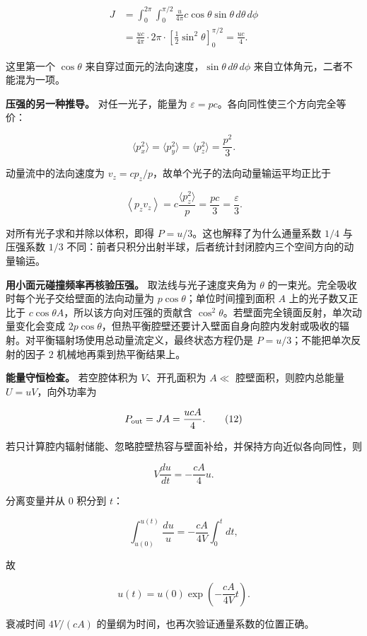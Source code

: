 \documentclass[12pt,a4paper,UTF8]{ctexart}
\begin{document}
\[
\begin{aligned}
J&=\int_0^{2\pi}\!\int_0^{\pi/2}
\frac{u}{4\pi}c\cos\theta\sin\theta\,d\theta\,d\phi\\
&=\frac{uc}{4\pi}\cdot2\pi\cdot
\left[\frac12\sin^2\theta\right]_0^{\pi/2}
=\frac{uc}{4}. 
\end{aligned} \tag{9}
\]

这里第一个 \(\cos\theta\)
来自穿过面元的法向速度，\(\sin\theta\,d\theta\,d\phi\)
来自立体角元，二者不能混为一项。

\textbf{压强的另一种推导。} 对任一光子，能量为
\(\varepsilon=pc\)。各向同性使三个方向完全等价：

\[
\langle p_x^2\rangle=
\langle p_y^2\rangle=
\langle p_z^2\rangle=\frac{p^2}{3}. \tag{10}
\]

动量流中的法向速度为 \(v_z=cp_z/p\)，故单个光子的法向动量输运平均正比于

\[
\left\langle p_zv_z\right\rangle
=c\frac{\langle p_z^2\rangle}{p}
=\frac{pc}{3}=\frac{\varepsilon}{3}. \tag{11}
\]

对所有光子求和并除以体积，即得 \(P=u/3\)。这也解释了为什么通量系数
\(1/4\) 与压强系数 \(1/3\)
不同：前者只积分出射半球，后者统计封闭腔内三个空间方向的动量输运。

\textbf{用小面元碰撞频率再核验压强。} 取法线与光子速度夹角为 \(\theta\)
的一束光。完全吸收时每个光子交给壁面的法向动量为
\(p\cos\theta\)；单位时间撞到面积 \(A\) 上的光子数又正比于
\(c\cos\theta A\)，所以该方向对压强的贡献含
\(\cos^2\theta\)。若壁面完全镜面反射，单次动量变化会变成
\(2p\cos\theta\)，但热平衡腔壁还要计入壁面自身向腔内发射或吸收的辐射。对平衡辐射场使用总动量流定义，最终状态方程仍是
\(P=u/3\)；不能把单次反射的因子 \(2\) 机械地再乘到热平衡结果上。

\textbf{能量守恒检查。} 若空腔体积为 \(V\)、开孔面积为 \(A\ll\)
腔壁面积，则腔内总能量 \(U=uV\)，向外功率为

\[
P_{\rm out}=JA=\frac{ucA}{4}. \tag{12}
\]

若只计算腔内辐射储能、忽略腔壁热容与壁面补给，并保持方向近似各向同性，则

\[
V\frac{du}{dt}=-\frac{cA}{4}u.
\]

分离变量并从 \(0\) 积分到 \(t\)：

\[
\int_{u(0)}^{u(t)}\frac{du}{u}
=-\frac{cA}{4V}\int_0^t dt,
\]

故

\[
u(t)=u(0)\exp\!\left(-\frac{cA}{4V}t\right). \tag{13}
\]

衰减时间 \(4V/(cA)\) 的量纲为时间，也再次验证通量系数的位置正确。
\end{document}
